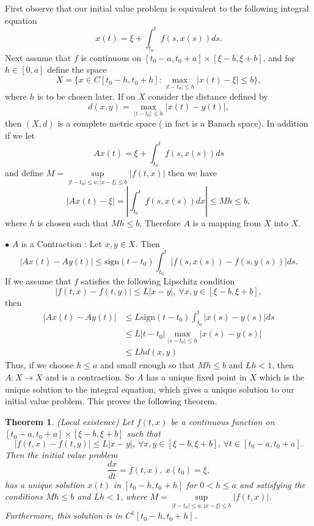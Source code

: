 \documentclass[12pt]{report}
\newtheorem{theorem}{Theorem}[section]
\begin{document}
\medskip
\noindent
First observe that our initial
value problem is equivalent to the following integral
equation
\[
x(t) =\xi + \int^t_{t_0} f(s, x(s)) ds.
\]
Next assume that $f$ is continuous on 
$[t_0-a, t_0+a]\times[\xi -b, \xi + b]$, and
 for $h \in [0, a] $ define the space
\[
X = \{x \in C[t_0-h, t_0+ h]:  \underset{|t-t_0| \le h}{\max} |x(t) -
\xi|
\le b\},
\]
where $h$ is to be chosen later. If on $X$ consider the distance
defined by 
\[
d(x,y)=\underset{|t-t_0| \le h}{\max}|x(t)-y(t)|,
\]
then $(X, d)$ is a complete metric space ( in fact is a Banach
space).  In addition   if we let
  \[
Ax(t) = \xi + \int^t_{t_0}f(s, x(s)) ds
\]
and define  $M = \underset{|t-t_0| \le a; |x-\xi| \le b}{\sup}
|f(t, x)|$ then  we have
\[
|Ax(t) - \xi| = |\int^t_{t_0} f(s, x(s)) dx | \le Mh \le b,
 \]
where $h$  is chosen such that $Mh \le b$. Therefore 
 $A$ is a mapping from $X$ into $X$. 

\medskip
\noindent
$\bullet$ 
  $A$ is a Contraction :  Let $x, y \in X$.  Then
\[
|Ax(t) - Ay(t)|  \le \text{sign} (t-t_0) \int^t_{t_0}|f(s, x(s)) - f(s,
y(s))|ds.
\]
If we assume that $f$ satisfies the following Lipschitz condition
\[
|f(t, x) - f(t, y) | \le L|x-y|, \ \forall x, y \in [\xi - b, \xi +
b],
\]
then 
\begin{eqnarray*}
|Ax(t)-Ay(t)| &\le
 L \text{sign} (t-t_0)\int^t_{t_0} |x(s) - y(s)|ds\\
&\le L|t-t_0| \underset{|s-t_0| \le h}{ \max } |x(s) - y(s)|\\
&\le Lh d(x,y) 
\end{eqnarray*}
Thus, if we choose $h\le a$ and small enough so that 
$Mh \le b$ and  $Lh < 1$, then $A: X\to X$ and is a
contraction.   So $A$ has a unique fixed point in $X$ which is the
unique solution to the integral equation, which gives a unique
solution to our initial value problem. This proves the following 
theorem.

\begin{theorem}\label{th:ODE} (Local existence) Let $f(t, x)$ be a
continuous function on $[t_0-a, t_0+a]\times [\xi -b, \xi + b]$ 
such that  
\[
|f(t, x) - f(t, y) | \le L|x-y|, \ \forall x, y \in [\xi - b, \xi +
b],\, \forall t\in  [t_0-a, t_0+a].
\]
Then the initial value problem
\[
\frac{dx}{dt} = f(t, x), \ x(t_0) = \xi,
\]
has a unique solution $x(t) $ in $[t_0-h, t_0+ h]$ for $0<h\le a$ and
satisfying the conditions $Mh \le b$ and  $Lh < 1$,
where  $M = \underset{|t-t_0| \le a; |x-\xi| \le b}{\sup}
|f(t, x)|$.
Furthermore, this
solution is in $ C^1[t_0-h, t_0+ h]$.
\end{theorem}
\end{document}
